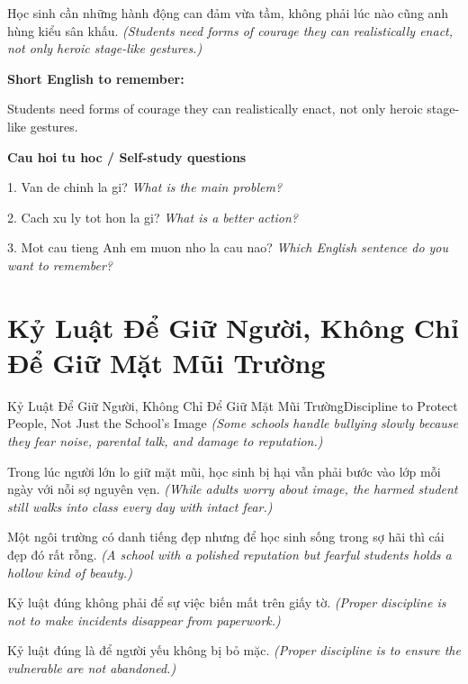 \begin{baihoc}
Học sinh cần những hành động can đảm vừa tầm, không phải lúc nào cũng anh hùng kiểu sân khấu.
\textit{(Students need forms of courage they can realistically enact, not only heroic stage-like gestures.)}
\end{baihoc}

\begin{ghinhoanh}
\textbf{Short English to remember:}

Students need forms of courage they can realistically enact, not only heroic stage-like gestures.

\end{ghinhoanh}

\begin{tuhocnhanh}
\textbf{Cau hoi tu hoc / Self-study questions}

1. Van de chinh la gi? \textit{What is the main problem?}

2. Cach xu ly tot hon la gi? \textit{What is a better action?}

3. Mot cau tieng Anh em muon nho la cau nao? \textit{Which English sentence do you want to remember?}
\end{tuhocnhanh}
\ngancach

\section{Kỷ Luật Để Giữ Người, Không Chỉ Để Giữ Mặt Mũi Trường}
\begin{truyen}{Kỷ Luật Để Giữ Người, Không Chỉ Để Giữ Mặt Mũi Trường}{Discipline to Protect People, Not Just the School’s Image}
\textit{(Some schools handle bullying slowly because they fear noise, parental talk, and damage to reputation.)}

Trong lúc người lớn lo giữ mặt mũi, học sinh bị hại vẫn phải bước vào lớp mỗi ngày với nỗi sợ nguyên vẹn.
\textit{(While adults worry about image, the harmed student still walks into class every day with intact fear.)}

Một ngôi trường có danh tiếng đẹp nhưng để học sinh sống trong sợ hãi thì cái đẹp đó rất rỗng.
\textit{(A school with a polished reputation but fearful students holds a hollow kind of beauty.)}

Kỷ luật đúng không phải để sự việc biến mất trên giấy tờ.
\textit{(Proper discipline is not to make incidents disappear from paperwork.)}

Kỷ luật đúng là để người yếu không bị bỏ mặc.
\textit{(Proper discipline is to ensure the vulnerable are not abandoned.)}

\end{truyen}

